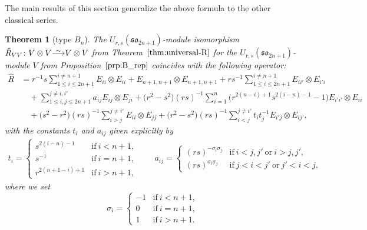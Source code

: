 \documentclass[10pt,a4paper]{amsart}
\numberwithin{equation}{section}
\newtheorem{Theorem}{Theorem}[section]
\newcommand{\sso}{\mathfrak{so}}
\newcommand\iso{ \vphantom{j^{X^2}}\smash{\overset{\sim}{\vphantom{\rule{0pt}{0.20em}}\smash{\longrightarrow}}} }
\begin{document}
The main results of this section generalize the above formula to the other classical series.


\begin{Theorem}[type $B_{n}$]\label{thm:B_RMatrix}
The $U_{r,s}(\sso_{2n+1})$-module isomorphism $\hat{R}_{VV}\colon V \otimes V \iso V \otimes V$ from Theorem~$\ref{thm:universal-R}$ for the $U_{r,s}(\sso_{2n+1})$-module $V$ from Proposition~$\ref{prp:B_rep}$ coincides with the following operator:
\begin{align}
 \hat{R} &{}=
 r^{-1}s \sum_{1\leq i\leq 2n+1}^{i\ne n+1} E_{ii} \otimes E_{ii} +
 E_{n + 1,n + 1} \otimes E_{n + 1,n+1} +
 rs^{-1} \sum_{1\leq i\leq 2n+1}^{i\ne n+1} E_{ii'} \otimes E_{i'i} \nonumber\\
 &\quad{}+ \sum_{1\leq i,j\leq 2n+1}^{j\ne i,i'} a_{ij}E_{ij} \otimes E_{ji} +
 \bigl(r^{2} - s^{2}\bigr)(rs)^{-1} \sum_{i = 1}^{n}\bigl(r^{2(n-i)+1}s^{2(i-n)-1}-1\bigr) E_{i'i'} \otimes E_{ii}\nonumber \\
 &\quad{}+ \bigl(s^{2} - r^{2}\bigr)(rs)^{-1} \sum_{i > j}^{j \neq i'} E_{ii} \otimes E_{jj} +
 \bigl(r^{2} - s^{2}\bigr)(rs)^{-1} \sum_{i < j}^{j \neq i'} t_{i}t_{j}^{-1}E_{i'j} \otimes E_{ij'},\label{eq:B_RMatrix}
\end{align}
with the constants $t_i$ and $a_{ij}$ given explicitly by
\begin{gather}\label{eq:B_coeffs}
 t_{i} =
 \begin{cases}
 s^{2(i - n) - 1} & \text{if}\ i < n + 1, \\
 s^{-1} & \text{if}\ i = n + 1, \\
 r^{2(n +1 - i) + 1} & \text{if}\ i > n + 1,
 \end{cases}\qquad
 a_{ij} =
 \begin{cases}
 (rs)^{-\sigma_{i}\sigma_{j}} & \text{if}\ i < j,j'\ \text{or}\ i > j,j', \\
 (rs)^{\sigma_{i}\sigma_{j}} & \text{if}\ j < i < j'\ \text{or}\ j' < i < j,
 \end{cases}
\end{gather}
where we set
\[
 \sigma_{i} =
 \begin{cases}
 -1 & \text{if}\ i < n + 1, \\
 0 & \text{if}\ i = n+ 1, \\
 1 & \text{if}\ i > n + 1.
 \end{cases}
\]
\end{Theorem}
\end{document}
